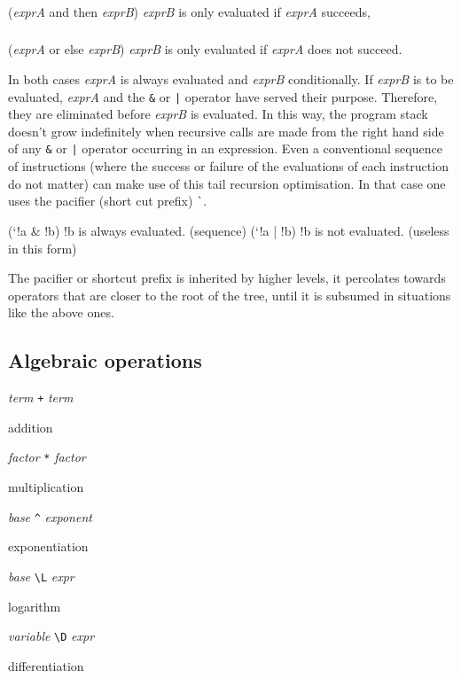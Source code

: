 \documentclass[12pt]{article}
\newcommand{\bfun}[1]{\subsubsection*{\normalfont{#1}}}
\newcommand{\bc}[1]{\texttt{#1}}
\begin{document}
\bfun{\emph{exprA} \bc{\&} \emph{exprB}}

(\emph{exprA} and then \emph{exprB}) \emph{exprB} is only evaluated if
\emph{exprA} succeeds,

\bfun{\emph{exprA} \bc{\char`\|} \emph{exprB}}

(\emph{exprA} or else \emph{exprB}) \emph{exprB} is only evaluated if
\emph{exprA} does not succeed.

In both cases \emph{exprA} is always evaluated and \emph{exprB}
conditionally. If \emph{exprB} is to be evaluated, \emph{exprA} and
the \verb|&| or \verb,|, operator have served their
purpose. Therefore, they are eliminated before \emph{exprB} is
evaluated. In this way, the program stack doesn't grow indefinitely
when recursive calls are made from the right hand side of any \verb|&|
or \verb,|, operator occurring in an expression. Even a conventional
sequence of instructions (where the success or failure of the
evaluations of each instruction do not matter) can make use of this
tail recursion optimisation. In that case one uses the pacifier (short
cut prefix) \verb|`|.
\begin{v}
(`!a & !b)     !b is always evaluated. (sequence)
(`!a | !b)     !b is not evaluated. (useless in this form)
\end{v}

The pacifier or shortcut prefix is inherited by higher levels, it
percolates towards operators that are closer to the root of the tree,
until it is subsumed in situations like the above ones.

\subsection{Algebraic operations}

\begin{description}
\item \emph{term} \verb|+| \emph{term}

  addition

\item \emph{factor} \verb|*| \emph{factor}

  multiplication

\item \emph{base} \verb|^| \emph{exponent}

  exponentiation

\item \emph{base} \verb|\L| \emph{expr}

  logarithm

\item \emph{variable} \verb|\D| \emph{expr}

  differentiation
\end{description}
\end{document}
